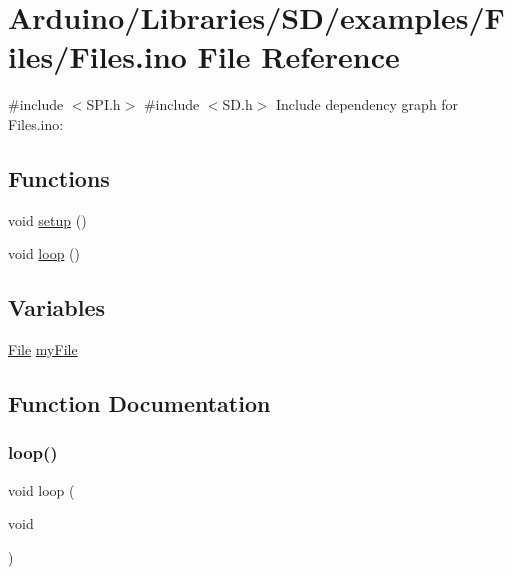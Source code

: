 \hypertarget{_files_8ino}{}\section{Arduino/\+Libraries/\+S\+D/examples/\+Files/\+Files.ino File Reference}
\label{_files_8ino}
{\ttfamily \#include $<$S\+P\+I.\+h$>$}\newline
{\ttfamily \#include $<$S\+D.\+h$>$}\newline
Include dependency graph for Files.\+ino\+:
\subsection*{Functions}
\begin{DoxyCompactItemize}
\item 
void \hyperlink{_files_8ino_a4fc01d736fe50cf5b977f755b675f11d}{setup} ()
\item 
void \hyperlink{_files_8ino_afe461d27b9c48d5921c00d521181f12f}{loop} ()
\end{DoxyCompactItemize}
\subsection*{Variables}
\begin{DoxyCompactItemize}
\item 
\hyperlink{class_s_d_lib_1_1_file}{File} \hyperlink{_files_8ino_a8eb13a6b9ea8026221cb3a45a822526a}{my\+File}
\end{DoxyCompactItemize}


\subsection{Function Documentation}
\mbox{\label{_files_8ino_afe461d27b9c48d5921c00d521181f12f}} 
\subsubsection{\texorpdfstring{loop()}{loop()}}
{\footnotesize\ttfamily void loop (\begin{DoxyParamCaption}\item[{void}]{ }\end{DoxyParamCaption})}

\mbox{\label{_files_8ino_a4fc01d736fe50cf5b977f755b675f11d}} 
